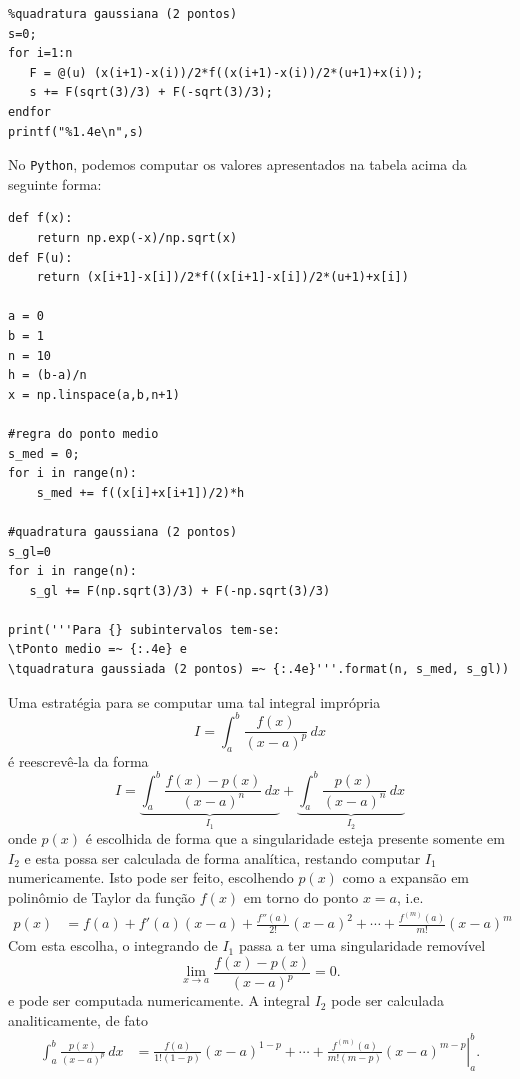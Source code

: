 \begin{ex}
\begin{verbatim}
%quadratura gaussiana (2 pontos)
s=0;
for i=1:n
   F = @(u) (x(i+1)-x(i))/2*f((x(i+1)-x(i))/2*(u+1)+x(i));
   s += F(sqrt(3)/3) + F(-sqrt(3)/3);
endfor
printf("%1.4e\n",s)
\end{verbatim}
\fi
\ifispython
No \verb+Python+, podemos computar os valores apresentados na tabela acima da seguinte forma:
\begin{verbatim}
def f(x):
    return np.exp(-x)/np.sqrt(x)
def F(u):
    return (x[i+1]-x[i])/2*f((x[i+1]-x[i])/2*(u+1)+x[i])

a = 0
b = 1
n = 10
h = (b-a)/n
x = np.linspace(a,b,n+1)

#regra do ponto medio
s_med = 0;
for i in range(n):
    s_med += f((x[i]+x[i+1])/2)*h

#quadratura gaussiana (2 pontos)
s_gl=0
for i in range(n):
   s_gl += F(np.sqrt(3)/3) + F(-np.sqrt(3)/3)

print('''Para {} subintervalos tem-se:
\tPonto medio =~ {:.4e} e
\tquadratura gaussiada (2 pontos) =~ {:.4e}'''.format(n, s_med, s_gl))
\end{verbatim}
\fi
\end{ex}

Uma estratégia para se computar uma tal integral imprópria
\begin{equation}
  I = \int_a^b\frac{f(x)}{(x-a)^p}\,dx
\end{equation}
é reescrevê-la da forma
\begin{equation}
  I = \underbrace{\int_a^b\frac{f(x)-p(x)}{(x-a)^n}\,dx}_{I_1} + \underbrace{\int_a^b \frac{p(x)}{(x-a)^n}\,dx}_{I_2}
\end{equation}
onde $p(x)$ é escolhida de forma que a singularidade esteja presente somente em $I_2$ e esta possa ser calculada de forma analítica, restando computar $I_1$ numericamente. Isto pode ser feito, escolhendo $p(x)$ como a expansão em polinômio de Taylor da função $f(x)$ em torno do ponto $x=a$, i.e.
\begin{equation}
  \begin{split}
    p(x) &= f(a) + f'(a)(x-a) + \frac{f''(a)}{2!}(x-a)^2 + \cdots + \frac{f^{(m)}(a)}{m!}(x-a)^m
  \end{split}
\end{equation}
Com esta escolha, o integrando de $I_1$ passa a ter uma singularidade removível
\begin{equation}
  \lim_{x\to a}\frac{f(x)-p(x)}{(x-a)^p} = 0.
\end{equation}
e pode ser computada numericamente. A integral $I_2$ pode ser calculada analiticamente, de fato
\begin{equation}
  \begin{split}
    \int_a^b \frac{p(x)}{(x-a)^p}\,dx &= \left.\frac{f(a)}{1!(1-p)}(x-a)^{1-p} + \cdots + \frac{f^{(m)}(a)}{m!(m-p)}(x-a)^{m-p}\right|_{a}^b.
  \end{split}
\end{equation}

